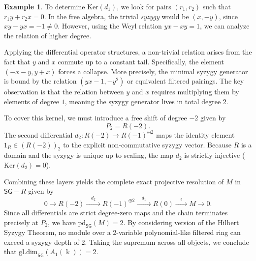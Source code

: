 \documentclass[reqno]{amsart}
\theoremstyle{definition}
\newtheorem{example}[theorem]{Example}
\theoremstyle{remark}
\numberwithin{equation}{section}
\begin{document}
\begin{example}
  To determine $\mathrm{Ker}(d_1)$, we look for pairs $(r_1, r_2)$ such that $r_1y + r_2 x = 0$. In the free algebra, the trivial {\em syzygy} would be $(x, - y)$, since $xy - yx = -1 \neq 0$. However, using the Weyl relation $y x - x y = 1$, we can analyze the relation of higher degree. 
    
    Applying the differential operator structures, a non-trivial relation arises from the fact that $y$ and $x$ conmute up to a constant tail. Specifically, the element $(-x - y, y + x)$ forces a collapse. More precisely, the minimal syzygy generator is bound by the relation $(y x - 1, - y^2)$ or equivalent filtered pairings. The key observation is that the relation between $y$ and $x$ requires multiplying them by elements of degree $1$, meaning the syzygy generator lives in total degree $2$.
    
    To cover this kernel, we must introduce a free shift of degree $-2$ given by 
    \[
    P_2 = R(-2).
    \]
    The second differential $d_2: R(-2) \to R(-1)^{\oplus 2}$ maps the identity element $1_R \in (R(-2))_2$ to the explicit non-commutative syzygy vector. Because $R$ is a domain and the syzygy is unique up to scaling, the map $d_2$ is strictly injective ($\mathrm{Ker}(d_2) = 0$).

Combining these layers yields the complete exact projective resolution of $M$ in $\mathsf{SG}-R$ given by 
\[
0 \longrightarrow R(-2) \xrightarrow{\quad d_2\quad } R(-1)^{\oplus 2} \xrightarrow{\quad d_1\quad } R(0) \xrightarrow{\quad \epsilon\quad } M \longrightarrow 0.
\]
Since all differentials are strict degree-zero maps and the chain terminates precisely at $P_2$, we have $\mathrm{pd}_{\mathsf{SG}}(M) = 2$. By considering version of the Hilbert Syzygy Theorem, no module over a 2-variable polynomial-like filtered ring can exceed a syzygy depth of $2$. Taking the supremum across all objects, we conclude that $\mathrm{gl.dim}_{\mathsf{SG}}({A_1(\Bbbk)}) = 2$.
\end{example}
\end{document}
